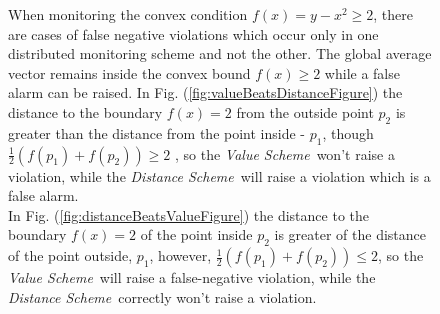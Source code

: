 \documentclass[10pt, conference]{IEEEtran}
\newcommand{\valueScheme}{\textit{Value Scheme}}
\newcommand{\distanceScheme}{\textit{Distance Scheme}}
\begin{document}
\begin{figure}[t]
\small
When monitoring the convex condition ${f(x) = y - x^2  \geq 2}$, there are cases of false negative violations which occur only in one distributed monitoring scheme and not the other. The global average vector remains inside the convex bound ${f(x) \geq 2}$ while a false alarm can be raised. In Fig. (\ref{fig:valueBeatsDistanceFigure}) the distance to the boundary $f(x) = 2$ from the outside point $p_2$ is greater than the distance from the point inside - $p_1$, though ${\frac{1}{2}(f(p_1)+f(p_2))\geq 2}$ , so the \valueScheme \ won't raise a violation, while the \distanceScheme \ will raise a violation which is a false alarm. \\
In Fig. (\ref{fig:distanceBeatsValueFigure}) the distance to the boundary $f(x) = 2$ of the point inside $p_2$ is greater of the distance of the point outside, $p_1$, however, ${\frac{1}{2}(f(p_1)+f(p_2))\leq 2}$, so the \valueScheme \ will raise a false-negative violation, while the \distanceScheme \ correctly won't raise a violation.
\end{figure}
\end{document}
